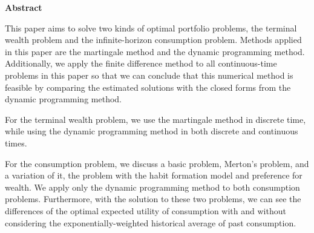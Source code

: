 \documentclass[a4paper]{article}
\theoremstyle{definition}
\numberwithin{equation}{section}
\begin{document}





\mbox{}\newline\vspace{10mm} \mbox{}\LARGE
%
{\bf Abstract} \normalsize \vspace{5mm}

This paper aims to solve two kinds of optimal portfolio problems, the terminal wealth problem and the infinite-horizon consumption problem. Methods applied in this paper are the martingale method and the dynamic programming method. Additionally, we apply the finite difference method to all continuous-time problems in this paper so that we can conclude that this numerical method is feasible by comparing the estimated solutions with the closed forms from the dynamic programming method.

For the terminal wealth problem, we use the martingale method in discrete time, while using the dynamic programming method in both discrete and continuous times.

For the consumption problem, we discuss a basic problem, Merton's problem, and a variation of it, the problem with the habit formation model and preference for wealth. We apply only the dynamic programming method to both consumption problems. Furthermore, with the solution to these two problems, we can see the differences of the optimal expected utility of consumption with and without considering the exponentially-weighted historical
average of past consumption.






\newpage
\setcounter{tocdepth}{4}

\tableofcontents %
 
\newpage %

\fancyhead{}
\fancyfoot{}
\pagestyle{fancy} 
\fancyhead[RO,LE]{\sffamily\small \thepage}
\fancyhead[LO,RE]{\sffamily\small \nouppercase{\rightmark}}
\renewcommand{\headrulewidth}{0.4pt}
\renewcommand{\footrulewidth}{0.0pt}
\end{document}
